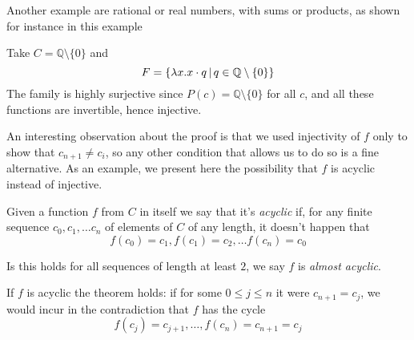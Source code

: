 Another example are rational or real numbers, with sums or products, as shown for instance in this example
\begin{example}
	Take $C = \mathbb{Q} \setminus \{ 0 \}$ and
	\[
	F = \{ \lambda x. x \cdot q \,\vert\, q \in \mathbb{Q} \setminus \{ 0 \} \}
	\]
	The family is highly surjective since $P(c) = \mathbb{Q} \setminus \{ 0 \}$ for all $c$, and all these functions are invertible, hence injective.
\end{example}

An interesting observation about the proof is that we used injectivity of $f$ only to show that $c_{n+1} \neq c_i$, so any other condition that allows us to do so is a fine alternative. As an example, we present here the possibility that $f$ is acyclic instead of injective.
\begin{definition}
	Given a function $f$ from $C$ in itself we say that it's \textit{acyclic} if, for any finite sequence $c_0, c_1, \dots c_n$ of elements of $C$ of any length, it doesn't happen that
	\[
	f(c_0) = c_1, f(c_1) = c_2, \dots f(c_n) = c_0
	\]

	Is this holds for all sequences of length at least $2$, we say $f$ is \textit{almost acyclic}.
\end{definition}
If $f$ is acyclic the theorem holds: if for some $0 \le j \le n$ it were $c_{n+1} = c_j$, we would incur in the contradiction that $f$ has the cycle
\[
f(c_j) = c_{j+1}, \dots, f(c_n) = c_{n+1} = c_j
\]

